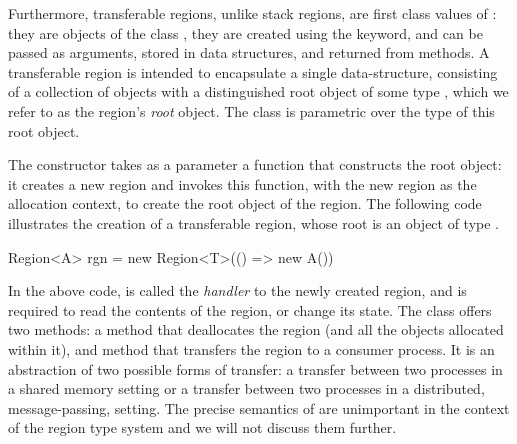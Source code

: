 Furthermore, transferable regions, unlike stack regions, are first
class values of \name: they are objects of the class , they
are created using the  keyword, and can be passed as arguments,
stored in data structures, and returned from methods.  A transferable
region is intended to encapsulate a single data-structure, consisting
of a collection of objects with a distinguished root object of some
type , which we refer to as the region's \emph{root} object.  The
class  is parametric over the type  of this root
object.

The  constructor takes as a parameter a function that
constructs the root object: it creates a new region and invokes this
function, with the new region as the allocation context, to create the
root object of the region. The following code illustrates the
creation of a transferable region, whose root is an object of type
.
\begin{codejava} 
  Region<A> rgn = new Region<T>(() => new A())
\end{codejava} 
In the above code,  is called the \emph{handler} to the newly
created region, and is required to read the contents of the region, or
change its state. The class  offers two methods: a 
method that deallocates the region (and all the objects allocated
within it), and  method that transfers the region to a
consumer process. It is an abstraction of two possible forms of
transfer: a transfer between two processes in a shared memory setting
or a transfer between two processes in a distributed, message-passing,
setting. The precise semantics of  are unimportant in the
context of the region type system and we will not discuss them
further.



